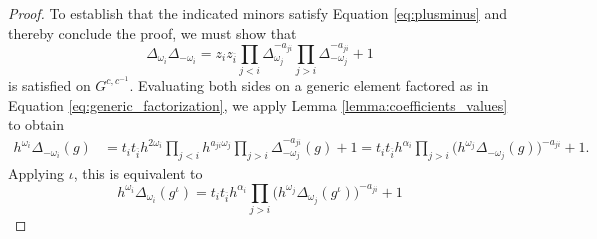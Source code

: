 \documentclass[12pt]{amsart}
\newcommand{\sayDR}[1]{\say[DR]{\color{red}{\bf DR:}\;#1}}
\newcommand{\ol}[1]{\overline{#1}}
\theoremstyle{remark}
\numberwithin{equation}{section}
\numberwithin{figure}{section}
\begin{document}
\begin{proof}
To establish that the indicated minors satisfy Equation \ref{eq:plusminus} and thereby conclude the proof, we must show that
  \begin{equation*} 
\Delta_{\omega_i}\Delta_{-\omega_i} =
    z_i z_{\ol{i}}
    \prod_{j<i}\Delta_{\omega_j}^{-a_{ji}}
    \prod_{j>i}\Delta_{-\omega_j}^{-a_{ji}}
    +1
  \end{equation*}
  is satisfied on $G^{c,c^{-1}}$. Evaluating both sides on a generic element factored as in Equation \ref{eq:generic_factorization}, we apply Lemma \ref{lemma:coefficients_values} to obtain
  \begin{align*}
    h^{\omega_i}\Delta_{-\omega_i}(g)
    &=
    t_i
    t_{\ol{i}}
    h^{2\omega_i}
    \prod_{j<i}h^{a_{j i}\omega_j}
    \prod_{j>i}\Delta_{-\omega_j}^{-a_{ji}}(g)
    +
    1
     = 
    t_i
    t_{\ol{i}}
    h^{\alpha_i}
    \prod_{j>i}\Big(h^{\omega_j}\Delta_{-\omega_j}(g)\Big)^{-a_{ji}}
    +
    1.
  \end{align*}
  Applying $\iota$, this is equivalent to  
  \begin{equation*}
    h^{\omega_i}\Delta_{\omega_i}(g^\iota) =
    t_i
    t_{\ol{i}}
    h^{\alpha_i}
    \prod_{j>i}\Big(h^{\omega_j}\Delta_{\omega_j}(g^\iota)\Big)^{-a_{ji}}
    +
    1
  \end{equation*}


\end{proof}
\end{document}

